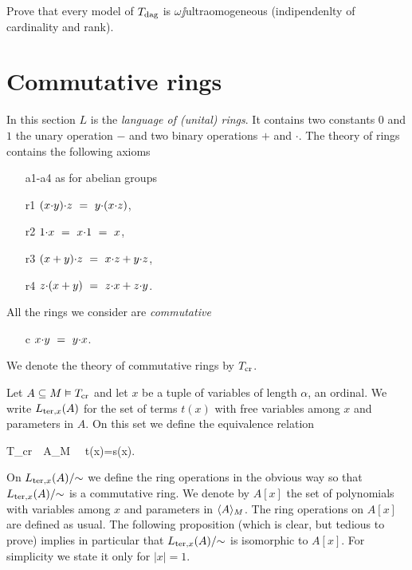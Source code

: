 \documentclass[creche.tex]{subfiles}
\begin{document}
\begin{exercise}
Prove that every model of $T_{\rm dag}$ is $\omega\jj$ultraomogeneous (indipendenlty of cardinality and rank).\QED
\end{exercise}

\section{Commutative rings}
\label{anelli}

In this section $L$ is the \emph{language of (unital) rings}. It contains two constants $0$ and $1$ the unary operation $-$ and two binary operations $+$ and $\cdot$. The theory of rings contains the following axioms

\begin{itemize}
\item[a1-a4] as for abelian groups
\item[r1] $(x\mdot y)\mdot z\  =\ y\mdot(x\mdot z)$,
\item[r2] $1\mdot x\ =\ x\mdot 1\ =\ x$,
\item[r3] $(x+y)\mdot z\ =\ x\mdot z + y\mdot z$,
\item[r4] $z\mdot (x+y)\ =\ z\mdot x + z\mdot y$.
\end{itemize}

All the rings we consider are \emph{commutative\/} 

\begin{itemize}
\item[c] $x\mdot y\ =\ y\mdot x$.
\end{itemize}
 
We denote the theory of commutative rings by \emph{$T_{\rm cr}$}.

Let  $A\subseteq M\models T_{\rm cr}$ and let $x$ be a tuple of variables of length $\alpha$, an ordinal. We write $L_{{\rm ter},x}(A)$ for the set of terms $t(x)$ with free variables among $x$ and parameters in $A$. On this set we define the equivalence relation

%
{\deq}%
{T_{\rm cr}\ \cup\ \Diag\<A\>_M \ \proves \ t(x)=s(x).}

On $L_{{\rm ter},x}(A)/\mathord{\sim}$ we define the ring operations in the obvious way so that $L_{{\rm ter},x}(A)/\mathord{\sim}$ is a commutative ring. We denote by $A[x]$ the set of polynomials with variables among $x$ and parameters in $\<A\>_M$. The ring operations on $A[x]$ are defined as usual. The following proposition (which is clear, but tedious to prove) implies in particular that $L_{{\rm ter},x}(A)/\mathord{\sim}$ is isomorphic to $A[x]$. For simplicity we state it only for $|x|=1$.
\end{document}

